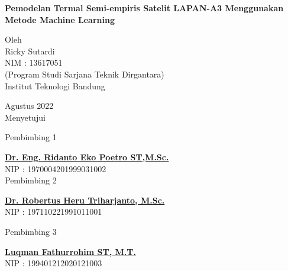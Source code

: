 \begin{center}
       \Large
        \vspace{1.5cm}
        \large
        \textbf{Pemodelan Termal Semi-empiris Satelit LAPAN-A3 Menggunakan Metode Machine Learning}\\
        
        \vfill
        
        Oleh\\
        Ricky Sutardi\\
        NIM : 13617051\\
        (Program Studi Sarjana Teknik Dirgantara)\\
        Institut Teknologi Bandung
       
       \vfill
       
       Agustus 2022\\
        \vspace{1.0cm}
       Menyetujui\\
       \begin{multicols}{2}
       
       \footnotesize Pembimbing 1 \\
       \vspace{3.5cm}
       
        \footnotesize \textbf{\underline{Dr. Eng. Ridanto Eko Poetro ST,M.Sc.}}\\
				\footnotesize NIP : 1970004201999031002 \\
        
        \footnotesize Pembimbing 2 \\
       \vspace{3.5cm}
       
       \footnotesize  \textbf{\underline{Dr. Robertus Heru Triharjanto, M.Sc.}}\\
        \footnotesize NIP : 197110221991011001 \\
        \end{multicols}

       \footnotesize Pembimbing 3 \\
       \vspace{3.5cm}
       
       \footnotesize \textbf{\underline{Luqman Fathurrohim ST, M.T.}}\\
        \footnotesize NIP : 199401212020121003 \\
       
\end{center}
